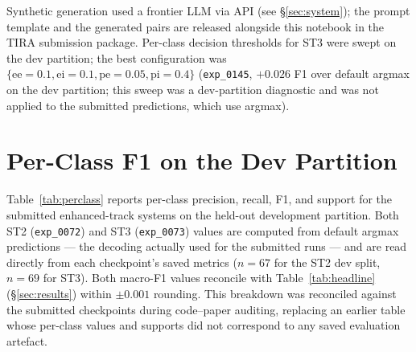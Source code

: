 \documentclass{ceurart}
\begin{document}
Synthetic generation used a frontier LLM via API (see \S\ref{sec:system});
the prompt template and the generated pairs are released alongside this
notebook in the TIRA submission package. Per-class decision thresholds for
ST3 were swept on the dev partition; the best configuration was
$\{\text{ee}{=}0.1, \text{ei}{=}0.1, \text{pe}{=}0.05, \text{pi}{=}0.4\}$
(\texttt{exp\_0145}, $+0.026$ F1 over default argmax on the dev partition; this sweep was a dev-partition diagnostic and was not applied to the submitted predictions, which use argmax). %

\section{Per-Class F1 on the Dev Partition}
\label{app:perclass}

Table~\ref{tab:perclass} reports per-class precision, recall, F1, and
support for the submitted enhanced-track systems on the held-out
development partition. Both ST2 (\texttt{exp\_0072}) and ST3
(\texttt{exp\_0073}) values are computed from default argmax predictions
--- the decoding actually used for the submitted runs --- and are read
directly from each checkpoint's saved metrics ($n=67$ for the ST2 dev
split, $n=69$ for ST3). Both macro-F1 values reconcile with
Table~\ref{tab:headline} (\S\ref{sec:results}) within $\pm 0.001$
rounding. This breakdown was reconciled against the submitted checkpoints
during code--paper auditing, replacing an earlier table whose per-class
values and supports did not correspond to any saved evaluation artefact.
\end{document}
